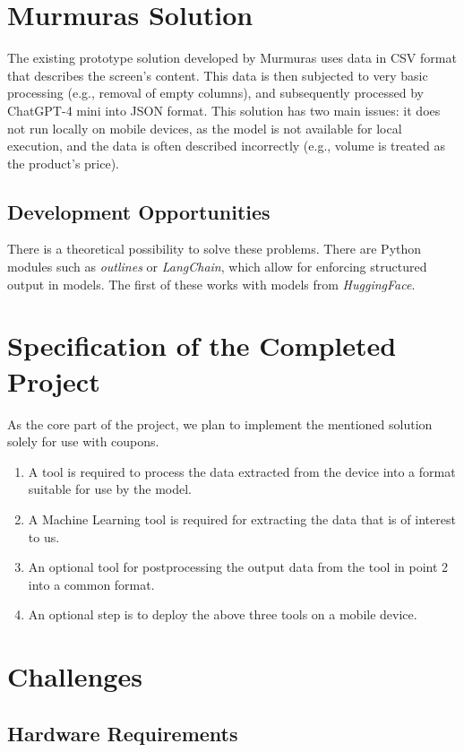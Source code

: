 \documentclass[12pt]{article}
\begin{document}
\section*{Murmuras Solution}
The existing prototype solution developed by Murmuras uses data in CSV format that describes the screen's content. This data is then subjected to very basic processing (e.g., removal of empty columns), and subsequently processed by ChatGPT-4 mini into JSON format. This solution has two main issues: it does not run locally on mobile devices, as the model is not available for local execution, and the data is often described incorrectly (e.g., volume is treated as the product's price).

\subsection*{Development Opportunities}
There is a theoretical possibility to solve these problems. There are Python modules such as \textit{outlines}\cite{willard2023efficient} or \textit{LangChain}\cite{Chase_LangChain_2022}, which allow for enforcing structured output in models. The first of these works with models from \textit{HuggingFace}.

\section*{Specification of the Completed Project}
As the core part of the project, we plan to implement the mentioned solution solely for use with coupons.
\begin{enumerate}
    \item A tool is required to process the data extracted from the device into a format suitable for use by the model.
    \item A Machine Learning tool is required for extracting the data that is of interest to us.
    \item An optional tool for postprocessing the output data from the tool in point 2 into a common format.
    \item An optional step is to deploy the above three tools on a mobile device.
\end{enumerate}

\section*{Challenges}

\subsection*{Hardware Requirements}
\end{document}

